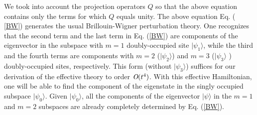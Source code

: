 \documentclass[floatfix,twocolumn,aps,prb,showpacs,superscriptaddress]{revtex4}
\begin{document}
We took into account the projection operators $Q$ so that the above equation
contains only the terms for which $Q$ equals unity. The above equation Eq. (%
\ref{BW}) generates the usual Brillouin-Wigner perturbation theory. One
recognizes that the second term and the last term in Eq. (\ref{BW}) are
components of the eigenvector in the subspace with $m=1$ doubly-occupied
site $|\psi _{1}\rangle $, while the third and the fourth terms are
components with $m=2$ ($|\psi _{2}\rangle $) and $m=3$ ($|\psi _{3}\rangle $%
) doubly-occupied sites, respectively. This form (without $|\psi _{3}\rangle
$) suffices for our derivation of the effective theory to order $\emph{O}%
(t^{4})$. With this effective Hamiltonian, one will be able to find the
component of the eigenstate in the singly occupied subspace $|\psi
_{0}\rangle $. Given $|\psi _{0}\rangle $, all the components of the
eigenvector $|\psi \rangle $ in the $m=1$ and $m=2$ subspaces are already
completely determined by Eq. (\ref{BW}).
\end{document}
